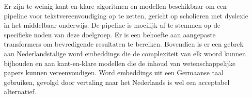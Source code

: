 Er zijn te weinig kant-en-klare algoritmen en modellen beschikbaar om een pipeline voor tekstvereenvoudiging op te zetten, gericht op scholieren met dyslexie in het middelbaar onderwijs. De pipeline is moeilijk af te stemmen op de specifieke noden van deze doelgroep. Er is een behoefte aan aangepaste transformers om bevredigende resultaten te bereiken. Bovendien is er een gebrek aan Nederlandstalige word embeddings die de complexiteit van elk woord kunnen bijhouden en aan kant-en-klare modellen die de inhoud van wetenschappelijke papers kunnen vereenvoudigen. Word embeddings uit een Germaanse taal gebruiken, gevolgd door vertaling naar het Nederlands is wel een acceptabel alternatief.